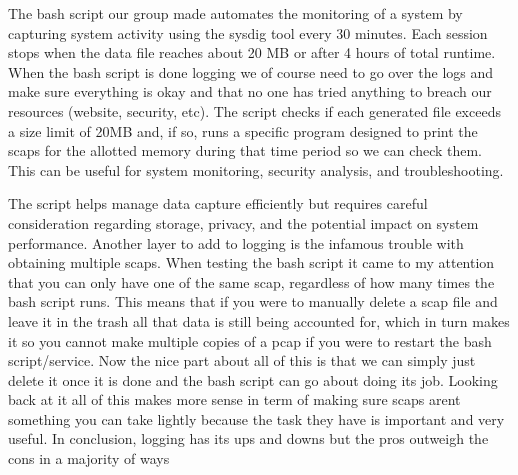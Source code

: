  The bash script our group made automates the monitoring of a system by capturing system activity using the sysdig tool every 30 minutes. Each session stops when the data file reaches about 20 MB or after 4 hours of total runtime. When the bash script is done logging we of course need to go over the logs and make sure everything is okay and that no one has tried anything to breach our resources (website, security, etc). The script checks if each generated file exceeds a size limit of 20MB and, if so, runs a specific program designed to print the scaps for the allotted memory during that time period so we can check them. This can be useful for system monitoring, security analysis, and troubleshooting. 

The script helps manage data capture efficiently but requires careful consideration regarding storage, privacy, and the potential impact on system performance. Another layer to add to logging is the infamous trouble with obtaining multiple scaps. When testing the bash script it came to my attention that you can only have one of the same scap, regardless of how many times the bash script runs. This means that if you were to manually delete a scap file and leave it in the trash all that data is still being accounted for, which in turn makes it so you cannot make multiple copies of a pcap if you were to restart the bash script/service. Now the nice part about all of this is that we can simply just delete it once it is done and the bash script can go about doing its job. Looking back at it all of this makes more sense in term of making sure scaps arent something you can take lightly because the task they have is important and very useful. In conclusion, logging has its ups and downs but the pros outweigh the cons in a majority of ways   
